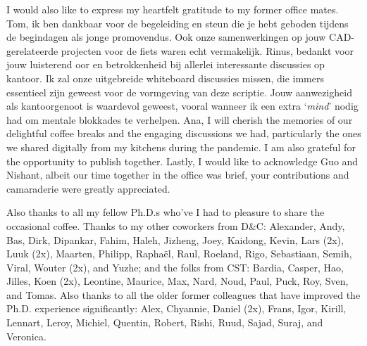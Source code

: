 I would also like to express my heartfelt gratitude to my former office mates. Tom, ik ben dankbaar voor de begeleiding en steun die je hebt geboden tijdens de begindagen als jonge promovendus. Ook onze samenwerkingen op jouw CAD-gerelateerde projecten voor de fiets waren echt vermakelijk. Rinus, bedankt voor jouw luisterend oor en betrokkenheid bij allerlei interessante discussies op kantoor. Ik zal onze uitgebreide whiteboard discussies missen, die immers essentieel zijn geweest voor de vormgeving van deze scriptie. Jouw aanwezigheid als kantoorgenoot is waardevol geweest, vooral wanneer ik een extra `\emph{mind}' nodig had om mentale blokkades te verhelpen. Ana, I will cherish the memories of our delightful coffee breaks and the engaging discussions we had, particularly the ones we shared digitally from my kitchens during the pandemic. I am also grateful for the opportunity to publish together. Lastly, I would like to acknowledge Guo and Nishant, albeit our time together in the office was brief, your contributions and camaraderie were greatly appreciated. 

Also thanks to all my fellow Ph.D.s who've I had to pleasure to share the occasional coffee. Thanks to my other coworkers from D\&C: Alexander, Andy, Bas, Dirk, Dipankar, Fahim, Haleh, Jizheng, Joey, Kaidong, Kevin, Lars (2x), Luuk (2x), Maarten, Philipp, Rapha\"{e}l, Raul, Roeland, Rigo, Sebastiaan, Semih, Viral, Wouter (2x), and Yuzhe; and the folks from CST: Bardia, Casper, Hao, Jilles, Koen (2x), Leontine, Maurice, Max, Nard, Noud, Paul, Puck, Roy, Sven, and Tomas. Also thanks to all the older former colleagues that have improved the Ph.D. experience significantly: Alex, Chyannie, Daniel (2x), Frans, Igor, Kirill, Lennart, Leroy, Michiel, Quentin, Robert, Rishi, Ruud, Sajad, Suraj, and Veronica.

